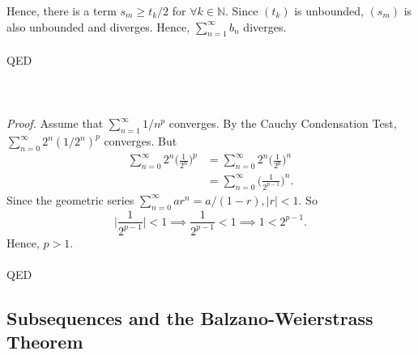 \documentclass{article}
\begin{document}
                Hence, there is a term $s_m \geq t_k/2$ for $\forall k \in \mathbb{N}$. Since $(t_k)$ is unbounded, $(s_m)$ is also unbounded and diverges. Hence, $\sum_{n=1}^\infty b_n$ diverges. \\ \\
                QED\\ \\
                \\ \\
                \textit{Proof.} Assume that $\sum_{n=1}^\infty 1/n^p$ converges. By the Cauchy Condensation Test, $\sum_{n=0}^\infty 2^n (1/2^n)^p$ converges. But
                \begin{align*}
                    \sum_{n=0}^\infty 2^n \bigg(\frac{1}{2^n}\bigg)^p &= \sum_{n=0}^\infty 2^n \bigg(\frac{1}{2^p}\bigg)^n \\
                    & = \sum_{n=0}^\infty \bigg(\frac{1}{2^{p-1}}\bigg)^n.
                \end{align*}
                Since the geometric series $\sum_{n=0}^\infty ar^n=a/(1-r),|r|<1$. So
                \begin{equation*}
                    \bigg|\frac{1}{2^{p-1}}\bigg| < 1 \implies \frac{1}{2^{p-1}} < 1 \implies 1 < 2^{p-1}.
                \end{equation*}
                Hence, $p>1$.\\ \\
                QED
            
            \subsection{Subsequences and the Balzano-Weierstrass Theorem}
                \\ \\
                
\end{document}
